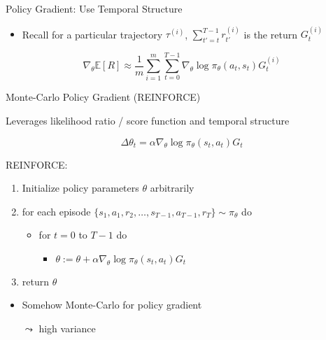 \documentclass[aspectratio=169]{../latex_main/tntbeamer}  %
\begin{document}
\begin{frame}[c]{Policy Gradient: Use Temporal Structure}
	
\begin{itemize}
	\item Recall for a particular trajectory $\tau^{(i)}$, $\sum_{t'=t}^{T-1} r_{t'}^{(i)}$ is the return $G_t^{(i)}$
\end{itemize}

$$\nabla_\theta \mathbb{E}[R] \approx \frac{1}{m} \sum_{i=1}^m \sum_{t=0}^{T-1} \nabla_\theta \log \pi_\theta (a_t,s_t) G_t^{(i)} $$
	
	
\end{frame}
\begin{frame}[c]{Monte-Carlo Policy Gradient (REINFORCE)}
	
Leverages likelihood ratio / score function and temporal structure

$$ \Delta \theta_t = \alpha \nabla_\theta \log \pi_\theta (s_t, a_t) G_t $$
	
	
REINFORCE:
\begin{enumerate}
	\item Initialize policy parameters $\theta$ arbitrarily
	\item for each episode $\{s_1, a_1, r_2, \ldots, s_{T-1}, a_{T-1}, r_T \} \sim \pi_\theta $ do
	\begin{itemize}
		\item for $t=0$ to $T - 1$ do
		\begin{itemize}
			\item $\theta := \theta + \alpha \nabla_\theta \log \pi_\theta (s_t, a_t) G_t $
		\end{itemize}
	\end{itemize}
	\item return $\theta$
\end{enumerate}

\begin{itemize}
    \item Somehow Monte-Carlo for policy gradient
    \item[$\leadsto$] high variance
\end{itemize}
	
\end{frame}
\end{document}
